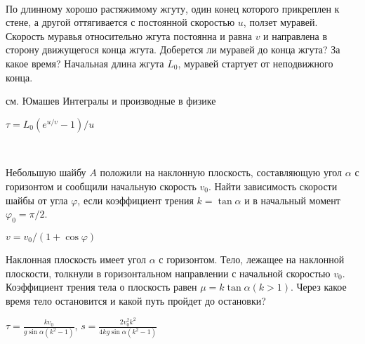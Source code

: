 \begin{samepage}
\begin{ex}
\hspace{0pt} \\
\begin{minipage}{.65\textwidth}
По длинному хорошо растяжимому жгуту, один конец которого прикреплен к стене, а другой оттягивается с постоянной скоростью $u$, ползет муравей. Скорость муравья относительно жгута постоянна и равна $v$ и направлена в сторону движущегося конца жгута. Доберется ли муравей до конца жгута? За какое время? Начальная длина жгута $L_0$, муравей стартует от неподвижного конца.
\end{minipage}
\begin{minipage}{.35\textwidth}
\centering

\end{minipage}
\begin{sol}
см. Юмашев Интегралы и производные в физике
\end{sol}
\begin{ans}
$\tau = L_0(e^{u/v} - 1)/u$
\end{ans}
\end{ex}
\end{samepage}

\begin{ex}
\hspace{0pt} \\
\begin{minipage}{.65\textwidth}
Небольшую шайбу $A$ положили на наклонную плоскость, составляющую угол $\alpha$ с горизонтом и сообщили начальную скорость $v_0$. Найти зависимость скорости шайбы от угла $\varphi$, если коэффициент трения $k = \tan \alpha$ и в начальный момент $\varphi_0 = \pi/2$.
\end{minipage}
\begin{minipage}{.35\textwidth}
\centering

\end{minipage}
\begin{ans}
$v=v_0/(1+\cos \varphi)$
\end{ans}
\end{ex}

\begin{ex}
Наклонная плоскость имеет угол $\alpha$ с горизонтом. Тело, лежащее на наклонной плоскости, толкнули в горизонтальном направлении с начальной скоростью $v_0$. Коэффициент трения тела о плоскость равен $\mu = k \tan \alpha (k > 1)$. Через какое время тело остановится и какой путь пройдет до остановки?
\begin{ans}
$\tau = \frac{kv_0}{g\sin\alpha(k^2-1)}$, $s = \frac{2v_0^2k^2}{4kg\sin\alpha(k^2-1)}$
\end{ans}
\end{ex}

